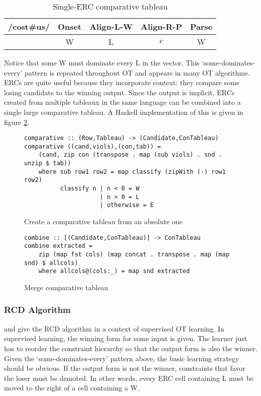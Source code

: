\documentclass[11pt]{article}
\begin{document}
\begin{table}[h]
  \begin{tabular}{|c||c|c|c|c|}\hline
/cost\#us/  & {\sc Onset} & {\sc Align-L-W} & {\sc Align-R-P} & {\sc Parse} \\ \hline\hline
  [cos.tus $\sim$ cos.us]  & W & L & $e$ & W \\ \hline
\end{tabular}
  \caption{Single-ERC comparative tableau}
  \label{erc-cmp-tab}
\end{table}

Notice that some W must dominate every L in the vector. This
`some-dominates-every' pattern
is repeated throughout OT and appears in many OT algorithms.
ERCs are quite useful because they incorporate
context: they compare some losing candidate to the winning
output. Since the output is implicit, ERCs created from multiple
tableaux in the same language can be combined into a single large
comparative tableau. A Haskell implementation of this is given in
figure \ref{haskell-erc-merge}.

\begin{figure}
\begin{verbatim}
comparative :: (Row,Tableau) -> (Candidate,ConTableau)
comparative ((cand,viols),(con,tab)) =
    (cand, zip con (transpose . map (sub viols) . snd . unzip $ tab))
    where sub row1 row2 = map classify (zipWith (-) row1 row2)
          classify n | n < 0 = W
                     | n > 0 = L
                     | otherwise = E
\end{verbatim}
  \caption{Create a comparative tableau from an absolute one}
  \label{haskell-normal-to-erc}
\end{figure}

\begin{figure}
\begin{verbatim}
combine :: [(Candidate,ConTableau)] -> ConTableau
combine extracted =
    zip (map fst cols) (map concat . transpose . map (map snd) $ allcols)
    where allcols@(cols:_) = map snd extracted
\end{verbatim}  
  \caption{Merge comparative tableau}
  \label{haskell-erc-merge}
\end{figure}

\subsubsection{RCD Algorithm}

 and  give the RCD algorithm in a
context of supervised OT learning.  In supervised learning, the
winning form for some input is given. The learner just has to reorder
the constraint hierarchy so that the output form is also the
winner. Given the `some-dominates-every' pattern above, the basic
learning strategy should be obvious. If the output form is not the
winner, constraints that favor the loser must be demoted. In other
words, every ERC cell containing L must be moved to the right of a
cell containing a W.
\end{document}
